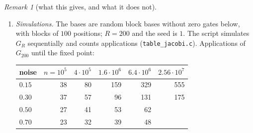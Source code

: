 \documentclass[11pt]{amsart}
\theoremstyle{definition}
\theoremstyle{remark}
\newtheorem{remark}[theorem]{Remark}
\begin{document}
\begin{remark}[what this gives, and what it does not]\label{rem:table}
\begin{enumerate}[label=(\roman*),leftmargin=2.4em]
\item \emph{Simulations.} The bases are random block bases without zero gates below, with blocks
of $100$ positions; $R=200$ and the seed is $1$. The script simulates $G_R$ sequentially and
counts applications (\texttt{table\_jacobi.c}). Applications of $G_{200}$ until the fixed point:

\begin{center}
\begin{tabular}{lrrrrr}
\toprule
noise & $n=10^5$ & $4\cdot10^5$ & $1.6\cdot10^6$ & $6.4\cdot10^6$ & $2.56\cdot10^7$\\
\midrule
$0.15$ & 38 & 80 & 159 & 329 & 555\\
$0.30$ & 37 & 57 & 96 & 131 & 175\\
$0.50$ & 27 & 41 & 53 & 62 & \\
$0.70$ & 23 & 32 & 39 & 48 & \\
\bottomrule
\end{tabular}
\end{center}


\end{enumerate}
\end{remark}
\end{document}
